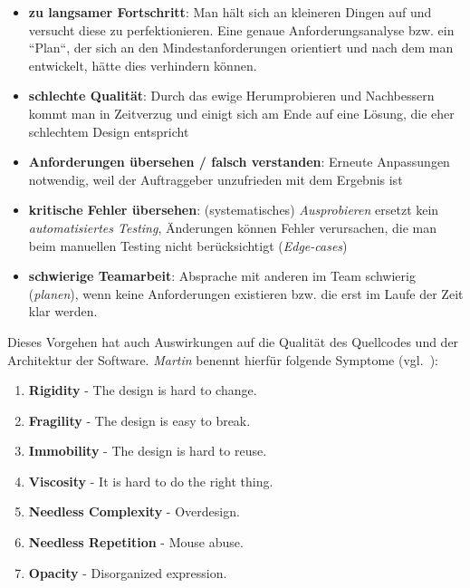 \begin{itemize}
    \item \textbf{zu langsamer Fortschritt}: Man hält sich an kleineren Dingen auf und versucht diese zu perfektionieren.
    Eine genaue Anforderungsanalyse bzw. ein ``Plan``, der sich an den Mindestanforderungen orientiert und nach dem man entwickelt, hätte dies verhindern können.
    \item \textbf{schlechte Qualität}: Durch das ewige Herumprobieren und Nachbessern kommt man in Zeitverzug und einigt sich am Ende auf eine Lösung, die eher schlechtem Design entspricht
    \item  \textbf{Anforderungen übersehen / falsch verstanden}: Erneute Anpassungen notwendig, weil der Auftraggeber unzufrieden mit dem Ergebnis ist
    \item \textbf{kritische Fehler übersehen}: (systematisches) \textit{Ausprobieren} ersetzt kein \textit{automatisiertes Testing}, Änderungen können Fehler verursachen, die man beim manuellen Testing nicht berücksichtigt (\textit{Edge-cases})
    \item \textbf{schwierige Teamarbeit}: Absprache mit anderen im Team schwierig (\textit{planen}), wenn keine Anforderungen existieren bzw. die erst im Laufe der Zeit klar werden.
\end{itemize}

\noindent
Dieses Vorgehen hat auch Auswirkungen auf die Qualität des Quellcodes und der Architektur der Software. \textit{Martin} benennt hierfür folgende Symptome (vgl.~\cite[85]{Mar03}):

\begin{tcolorbox}[title=Symptoms of Poor Design]
    \begin{enumerate}
        \item \textbf{Rigidity} - The design is hard to change.
        \item \textbf{Fragility} - The design is easy to break.
        \item \textbf{Immobility} - The design is hard to reuse.
        \item \textbf{Viscosity} - It is hard to do the right thing.
        \item \textbf{Needless Complexity} - Overdesign.
        \item \textbf{Needless Repetition} - Mouse abuse.
        \item \textbf{Opacity} - Disorganized expression.
    \end{enumerate}
\end{tcolorbox}

